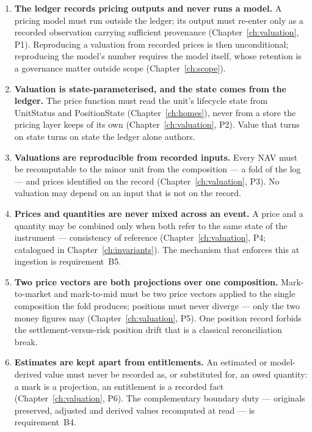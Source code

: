 \documentclass[11pt,a4paper]{article}
\begin{document}
\begin{enumerate}[label=\textbf{V\arabic*.}, ref=V\arabic*, leftmargin=*, itemsep=3pt]
\item \textbf{The ledger records pricing outputs and never runs a model.} A pricing model
  must run outside the ledger; its output must re-enter only as a recorded observation
  carrying sufficient provenance (Chapter~\ref{ch:valuation}, P1). Reproducing a valuation
  from recorded prices is then unconditional; reproducing the model's number requires the
  model itself, whose retention is a governance matter outside scope
  (Chapter~\ref{ch:scope}).
\item \textbf{Valuation is state-parameterised, and the state comes from the ledger.} The
  price function must read the unit's lifecycle state from UnitStatus and PositionState
  (Chapter~\ref{ch:homes}), never from a store the pricing layer keeps of its own
  (Chapter~\ref{ch:valuation}, P2). Value that turns on state turns on state the ledger
  alone authors.
\item \textbf{Valuations are reproducible from recorded inputs.} Every NAV must be
  recomputable to the minor unit from the composition --- a fold of the log --- and prices
  identified on the record (Chapter~\ref{ch:valuation}, P3). No valuation may depend on an
  input that is not on the record.
\item \textbf{Prices and quantities are never mixed across an event.} A price and a
  quantity may be combined only when both refer to the same state of the instrument ---
  consistency of reference (Chapter~\ref{ch:valuation}, P4; catalogued in
  Chapter~\ref{ch:invariants}). The mechanism that enforces this at ingestion is
  requirement~B5.
\item \textbf{Two price vectors are both projections over one composition.} Mark-to-market
  and mark-to-mid must be two price vectors applied to the single composition the fold
  produces; positions must never diverge --- only the two money figures may
  (Chapter~\ref{ch:valuation}, P5). One position record forbids the settlement-versus-risk
  position drift that is a classical reconciliation break.
\item \textbf{Estimates are kept apart from entitlements.} An estimated or model-derived
  value must never be recorded as, or substituted for, an owed quantity: a mark is a
  projection, an entitlement is a recorded fact (Chapter~\ref{ch:valuation}, P6). The
  complementary boundary duty --- originals preserved, adjusted and derived values
  recomputed at read --- is requirement~B4.
\end{enumerate}
\end{document}
